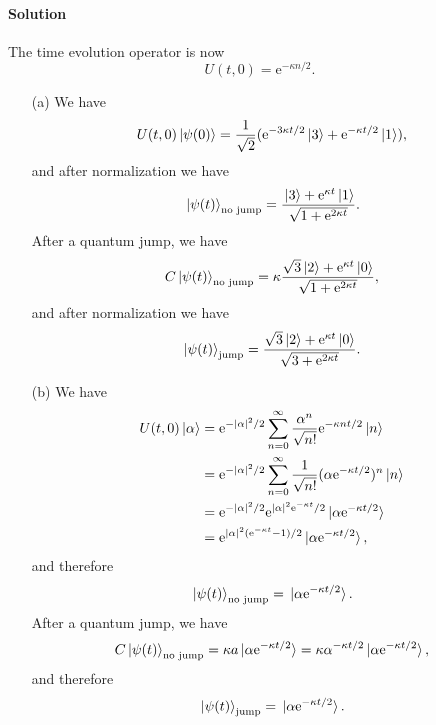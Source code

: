 \documentclass[hyperref, a4paper]{article}
\newcommand*{\ee}{\mathrm{e}}
\begin{document}
\paragraph{Solution} The time evolution operator is now 
\begin{equation}
    U(t, 0) = \ee^{- \kappa n / 2}.
\end{equation}
\begin{itemize}
\item[(a)] We have 
\[
    U(t, 0) \ket*{\psi(0)} = \frac{1}{\sqrt{2}} (\ee^{- 3 \kappa t / 2} \ket*{3} + \ee^{- \kappa t / 2} \ket*{1}) ,
\]
and after normalization we have 
\begin{equation}
    \ket*{\psi(t)}_\text{no jump} = \frac{\ket*{3} + \ee^{\kappa t} \ket*{1}}{\sqrt{1 + \ee^{2 \kappa t}}}.
\end{equation}
After a quantum jump, we have 
\[
    C \ket*{\psi(t)}_\text{no jump} = \kappa \frac{ \sqrt{3} \ket*{2} + \ee^{\kappa t} \ket*{0}}{\sqrt{1 + \ee^{2 \kappa t}}},
\] 
and after normalization we have 
\begin{equation}
    \ket*{\psi(t)}_\text{jump} = \frac{\sqrt{3} \ket*{2} + \ee^{\kappa t} \ket*{0}}{\sqrt{3 + \ee^{2 \kappa t}}}.
\end{equation}
\item[(b)] We have 
\[
    \begin{aligned}
        U(t, 0) \ket*{\alpha} &= \ee^{- \abs*{\alpha}^2 / 2} \sum_{n=0}^\infty \frac{\alpha^n}{\sqrt{n!}} \ee^{- \kappa n t / 2} \ket*{n} \\
        &= \ee^{- \abs*{\alpha}^2 / 2} \sum_{n=0}^\infty \frac{1}{\sqrt{n!}} (\alpha \ee^{- \kappa t / 2})^n \ket*{n} \\
        &= \ee^{- \abs*{\alpha}^2 / 2} \ee^{ \abs*{\alpha}^2 \ee^{-\kappa t} / 2} \ket*{\alpha \ee^{- \kappa t / 2}} \\
        &= \ee^{\abs*{\alpha}^2 (\ee^{-\kappa t} - 1) / 2} \ket*{\alpha \ee^{- \kappa t / 2}} ,
    \end{aligned}
\] 
and therefore 
\begin{equation}
    \ket*{\psi(t)}_\text{no jump} = \ket*{\alpha \ee^{- \kappa t / 2}} .
\end{equation}
After a quantum jump, we have 
\[
    C \ket*{\psi(t)}_\text{no jump} = \kappa a \ket*{\alpha \ee^{- \kappa t / 2}} = \kappa \alpha^{-\kappa t /2} \ket*{\alpha \ee^{- \kappa t / 2}},
\]
and therefore 
\begin{equation}
    \ket*{\psi(t)}_\text{jump} = \ket*{\alpha \ee^{- \kappa t / 2}}.
\end{equation}

\end{itemize}
\end{document}
